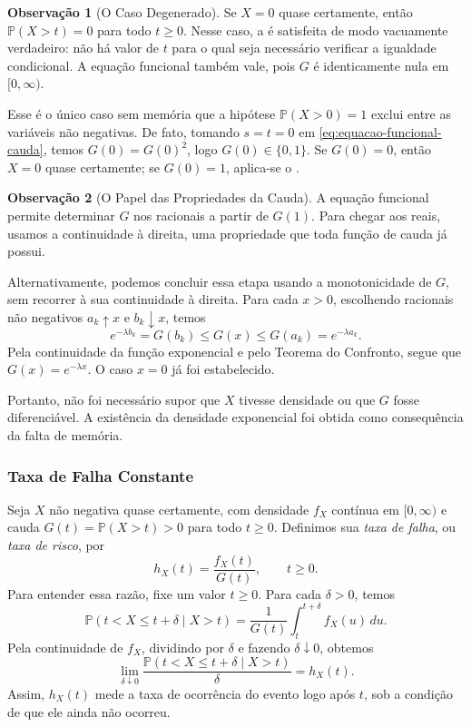 \documentclass[12pt,portuguese]{article}
\theoremstyle{definition}
\newtheorem{remark}[remark]{Observação}
\theoremstyle{plainexercise}
\theoremstyle{starredexercise}
\theoremstyle{definition}
\begin{document}
\begin{remark}[O Caso Degenerado]\label{rem:caso-degenerado}
Se $X=0$ quase certamente, então $\mathbb{P}(X>t)=0$ para todo
$t\geqslant0$. Nesse caso, a  é satisfeita
de modo vacuamente verdadeiro: não há valor de $t$ para o qual seja
necessário verificar a igualdade condicional. A equação funcional também
vale, pois $G$ é identicamente nula em $[0,\infty)$.

Esse é o único caso sem memória que a hipótese
$\mathbb{P}(X>0)=1$ exclui entre as variáveis não negativas. De fato,
tomando $s=t=0$ em \eqref{eq:equacao-funcional-cauda}, temos
$G(0)=G(0)^2$, logo $G(0)\in\{0,1\}$. Se $G(0)=0$, então $X=0$ quase
certamente; se $G(0)=1$, aplica-se o
.
\end{remark}

\begin{remark}[O Papel das Propriedades da Cauda]\label{rem:regularidade-equacao-funcional}
A equação funcional permite determinar $G$ nos racionais a partir de
$G(1)$. Para chegar aos reais, usamos a continuidade à direita, uma
propriedade que toda função de cauda já possui.

Alternativamente, podemos concluir essa etapa usando a monotonicidade de
$G$, sem recorrer à sua continuidade à direita. Para cada $x>0$,
escolhendo racionais não negativos $a_k\uparrow x$ e $b_k\downarrow x$,
temos
\[
  e^{-\lambda b_k}=G(b_k)\leqslant G(x)\leqslant G(a_k)=e^{-\lambda a_k}.
\]
Pela continuidade da função exponencial e pelo Teorema do Confronto,
segue que $G(x)=e^{-\lambda x}$. O caso $x=0$ já foi estabelecido.

Portanto, não foi necessário supor que $X$ tivesse densidade ou que $G$
fosse diferenciável. A existência da
densidade exponencial foi obtida como consequência da falta de memória.
\end{remark}

\subsubsection{Taxa de Falha Constante}

Seja $X$ não negativa quase certamente, com densidade $f_X$ contínua em
$[0,\infty)$ e cauda $G(t)=\mathbb{P}(X>t)>0$ para todo $t\geqslant0$.
Definimos sua \emph{taxa de falha}, ou \emph{taxa de risco}, por
\[
  h_X(t)=\frac{f_X(t)}{G(t)},\qquad t\geqslant0.
\]
Para entender essa razão, fixe um valor $t\geqslant0$. Para cada $\delta>0$, temos
\[
  \mathbb{P}(t<X\leqslant t+\delta\mid X>t)
  =\frac{1}{G(t)}\int_t^{t+\delta}f_X(u)\,du.
\]
Pela continuidade de $f_X$, dividindo por $\delta$ e fazendo
$\delta\downarrow0$, obtemos
\[
  \lim_{\delta\downarrow0}
  \frac{\mathbb{P}(t<X\leqslant t+\delta\mid X>t)}{\delta}
  =h_X(t).
\]
Assim, $h_X(t)$ mede a taxa de ocorrência do evento logo após $t$, sob a
condição de que ele ainda não ocorreu.
\end{document}
